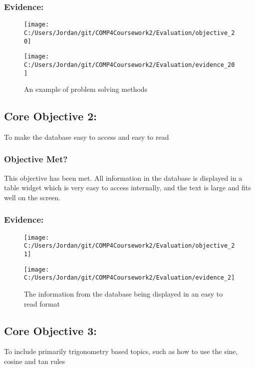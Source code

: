 \subsubsection{Evidence: }

\begin{figure}[H]
	\texttt{[image: C:/Users/Jordan/git/COMP4Coursework2/Evaluation/objective\_20]}
\end{figure}

\begin{figure}[H]
	\texttt{[image: C:/Users/Jordan/git/COMP4Coursework2/Evaluation/evidence\_20]}
	\caption{An example of problem solving methods}
\end{figure}

\subsection{Core Objective 2: }

To make the database easy to access and easy to read

\subsubsection{Objective Met?}

This objective has been met. All information in the database is displayed in a table widget which is very easy to access internally, and the text is large and fits well on the screen.

\subsubsection{Evidence: }

\begin{figure}[H]
	\texttt{[image: C:/Users/Jordan/git/COMP4Coursework2/Evaluation/objective\_21]}
\end{figure}

\begin{figure}[H]
	\texttt{[image: C:/Users/Jordan/git/COMP4Coursework2/Evaluation/evidence\_2]}
	\caption{The information from the database being displayed in an easy to read format}
\end{figure}

\subsection{Core Objective 3: }

To include primarily trigonometry based topics, such as how to use the sine, cosine and tan rules

